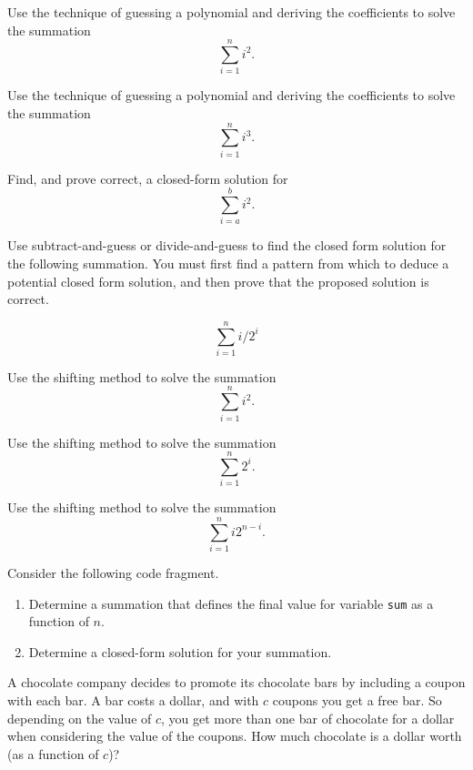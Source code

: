 \begin{exercises}

\item
Use the technique of guessing a polynomial and deriving the
coefficients to solve the summation
\[\sum_{i = 1}^{n} i^2.\]

\item
Use the technique of guessing a polynomial and deriving the
coefficients to solve the summation
\[\sum_{i = 1}^{n} i^3.\]

\item
Find, and prove correct, a closed-form solution for
\[\sum_{i = a}^{b} i^2.\]

\item
Use subtract-and-guess or divide-and-guess to find the
closed form solution for the following summation. You must first find
a pattern from which to deduce a potential closed form solution,
and then prove that the proposed solution is correct.

\[ \sum_{i=1}^n i/2^i \]

\item
Use the shifting method to solve the
summation
\[\sum_{i=1}^{n} i^2.\]

\item
Use the shifting method to solve the
summation
\[\sum_{i=1}^{n} 2^i.\]

\item
Use the shifting method to solve the
summation
\[\sum_{i=1}^{n} i 2^{n-i}.\]

\item
Consider the following code fragment.

\begin{enumerate}
\item
Determine a summation that defines the final
value for variable \texttt{sum} as a function of $n$.

\item
Determine a closed-form solution for your summation.
\end{enumerate}

\item
A chocolate company decides to promote its chocolate bars by including
a coupon with each bar.
A bar costs a dollar, and with \(c\) coupons you get a free bar.
So depending on the value of \(c\), you get more than one bar of
chocolate for a dollar when considering the value of the coupons.
How much chocolate is a dollar worth (as a function of \(c\))?


\end{exercises}
